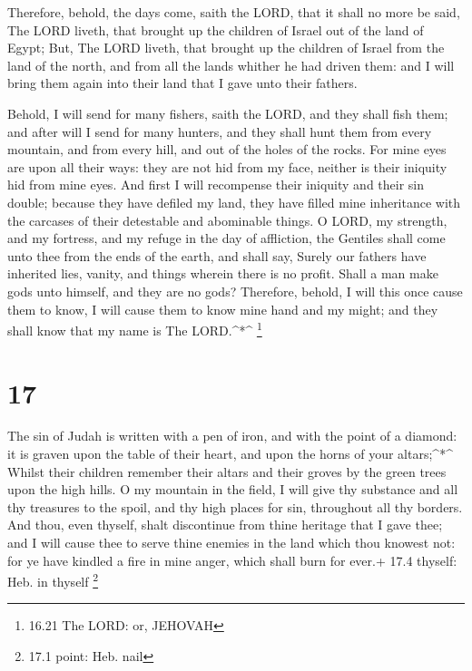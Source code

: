  Therefore, behold, the days come, saith the LORD, that it
shall no more be said, The LORD liveth, that brought up the children of
Israel out of the land of Egypt;  But, The LORD liveth,
that brought up the children of Israel from the land of the north, and
from all the lands whither he had driven them: and I will bring them
again into their land that I gave unto their fathers.

 Behold, I will send for many fishers, saith the LORD, and
they shall fish them; and after will I send for many hunters, and they
shall hunt them from every mountain, and from every hill, and out of the
holes of the rocks.  For mine eyes are upon all their ways:
they are not hid from my face, neither is their iniquity hid from mine
eyes.  And first I will recompense their iniquity and their
sin double; because they have defiled my land, they have filled mine
inheritance with the carcases of their detestable and abominable things.
 O LORD, my strength, and my fortress, and my refuge in the
day of affliction, the Gentiles shall come unto thee from the ends of
the earth, and shall say, Surely our fathers have inherited lies,
vanity, and things wherein there is no profit.  Shall a man
make gods unto himself, and they are no gods?  Therefore,
behold, I will this once cause them to know, I will cause them to know
mine hand and my might; and they shall know that my name is The
LORD.\^{}*\^{} \footnote{16.21 The LORD: or, JEHOVAH}

\hypertarget{section-16}{%
\section{17}\label{section-16}}

 The sin of Judah is written with a pen of iron, and with
the point of a diamond: it is graven upon the table of their heart, and
upon the horns of your altars;\^{}*\^{}  Whilst their
children remember their altars and their groves by the green trees upon
the high hills.  O my mountain in the field, I will give thy
substance and all thy treasures to the spoil, and thy high places for
sin, throughout all thy borders.  And thou, even thyself,
shalt discontinue from thine heritage that I gave thee; and I will cause
thee to serve thine enemies in the land which thou knowest not: for ye
have kindled a fire in mine anger, which shall burn for ever.+ 17.4
thyself: Heb. in thyself \footnote{17.1 point: Heb. nail}

